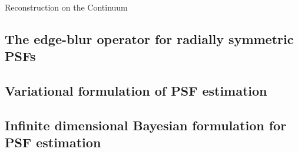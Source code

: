 \begin{chapter}{Reconstruction on the Continuum}
\subsection{The edge-blur operator for radially symmetric PSFs}
\subsection{Variational formulation of PSF estimation}
\subsection{Infinite dimensional Bayesian formulation for PSF estimation}

\end{chapter}
